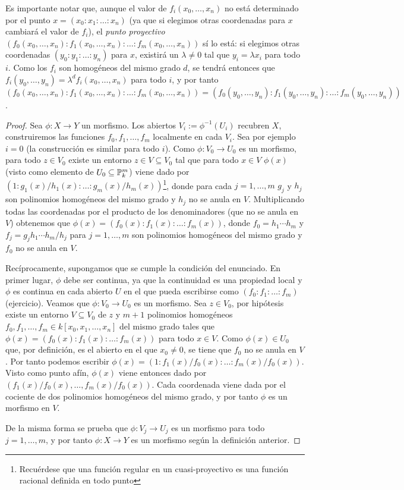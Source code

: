 \documentclass[ACGA.tex]{subfiles}
\begin{document}
Es importante notar que, aunque el valor de $f_i(x_0,\ldots,x_n)$ no está determinado por el punto $x=(x_0:x_1:\ldots:x_n)$ (ya que si elegimos otras coordenadas para $x$ cambiará el valor de $f_i$), el \emph{punto proyectivo} $(f_0(x_0,\ldots,x_n):f_1(x_0,\ldots,x_n):\ldots:f_m(x_0,\ldots,x_n))$ sí lo está: si elegimos otras coordenadas $(y_0:y_1:\ldots:y_n)$ para $x$, existirá un $\lambda\neq 0$ tal que $y_i=\lambda x_i$ para todo $i$. Como los $f_i$ son homogéneos del mismo grado $d$, se tendrá entonces que $f_i(y_0,\ldots,y_n)=\lambda^d f_i(x_0,\ldots,x_n)$ para todo $i$, y por tanto $(f_0(x_0,\ldots,x_n):f_1(x_0,\ldots,x_n):\ldots:f_m(x_0,\ldots,x_n))=(f_0(y_0,\ldots,y_n):f_1(y_0,\ldots,y_n):\ldots:f_m(y_0,\ldots,y_n))$.

\begin{proof}
 Sea $\phi:X\to Y$ un morfismo. Los abiertos $V_i:=\phi^{-1}(U_i)$ recubren $X$, construiremos las funciones $f_0,f_1,\ldots,f_m$ localmente en cada $V_i$. Sea por ejemplo $i=0$ (la construcción es similar para todo $i$). Como $\phi:V_0\to U_0$ es un morfismo, para todo $z\in V_0$ existe un entorno $z\in V\subseteq V_0$ tal que para todo $x\in V$ $\phi(x)$ (visto como elemento de $U_0\subseteq\mathbb{P}^m_k$) viene dado por $(1:g_1(x)/h_1(x):\ldots:g_m(x)/h_m(x))$\footnote{Recuérdese que una función regular en un cuasi-proyectivo es una función racional definida en todo punto}, donde para cada $j=1,\ldots,m$ $g_j$ y $h_j$ son polinomios homogéneos del mismo grado y $h_j$ no se anula en $V$. Multiplicando todas las coordenadas por el producto de los denominadores (que no se anula en $V$) obtenemos que $\phi(x)=(f_0(x):f_1(x):\ldots:f_m(x))$, donde $f_0=h_1\cdots h_m$ y $f_j=g_jh_1\cdots h_m/h_j$ para $j=1,\ldots,m$ son polinomios homogéneos del mismo grado y $f_0$ no se anula en $V$.

Recíprocamente, supongamos que se cumple la condición del enunciado. En primer lugar, $\phi$ debe ser continua, ya que la continuidad es una propiedad local y $\phi$ es continua en cada abierto $U$ en el que pueda escribirse como $(f_0:f_1:\ldots:f_m)$ (ejercicio). Veamos que $\phi:V_0\to U_0$ es un morfismo. Sea $z\in V_0$, por hipótesis existe un entorno $V\subseteq V_0$ de $z$ y $m+1$ polinomios homogéneos $f_0,f_1,\ldots,f_m\in k[x_0,x_1,\ldots,x_n]$ del mismo grado tales que $\phi(x)=(f_0(x):f_1(x):\ldots:f_m(x))$ para todo $x\in V$. Como $\phi(x)\in U_0$ que, por definición, es el abierto en el que $x_0\neq 0$, se tiene que $f_0$ no se anula en $V$. Por tanto podemos escribir $\phi(x)=(1:f_1(x)/f_0(x):\ldots:f_m(x)/f_0(x))$. Visto como punto afín, $\phi(x)$ viene entonces dado por $(f_1(x)/f_0(x),\ldots,f_m(x)/f_0(x))$. Cada coordenada viene dada por el cociente de dos polinomios homogéneos del mismo grado, y por tanto $\phi$ es un morfismo en $V$.

De la misma forma se prueba que $\phi:V_j\to U_j$ es un morfismo para todo $j=1,\ldots,m$, y por tanto $\phi:X\to Y$ es un morfismo según la definición anterior.
\end{proof}
\end{document}

